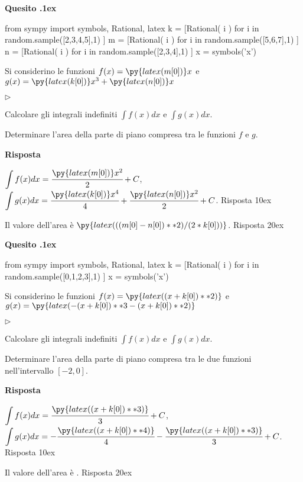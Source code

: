 \documentclass[11pt,twoside,a4paper]{article}
\newcommand{\mylabel}[1]{#1\hfill}
\renewenvironment{itemize}
  {\begin{list}{$\triangleright$}{%
   \setlength{\parskip}{0mm}
   \setlength{\topsep}{.4\baselineskip}
   \setlength{\rightmargin}{0mm}
   \setlength{\listparindent}{0mm}
   \setlength{\itemindent}{0mm}
   \setlength{\labelwidth}{2ex}
   \setlength{\itemsep}{.4\baselineskip}
   \setlength{\parsep}{0mm}
   \setlength{\partopsep}{0mm}
   \setlength{\labelsep}{1ex}
   \setlength{\leftmargin}{\labelwidth+\labelsep}
   \let\makelabel\mylabel}}{%
   \end{list}\vspace*{-1.3mm}}
\newcounter{quesito}
\newenvironment{question}{\bigskip\addtocounter{quesito}{1}\bigskip\bigskip\par\textbf{Quesito \thequesito.\kern1ex}}{\vspace{\parskip}}
\newenvironment{answer}{\par\textbf{Risposta\quad}}{\vspace{\parskip}}
\begin{document}
\begin{question}
\begin{pycode}
from sympy import symbols, Rational, latex
k = [Rational( i ) for i in random.sample([2,3,4,5],1) ]
m = [Rational( i ) for i in random.sample([5,6,7],1) ]
n = [Rational( i ) for i in random.sample([2,3,4],1) ]
x = symbols('x')
\end{pycode}
Si considerino le funzioni $f(x) = \py{latex(m[0])} x$ e $g(x) = \py{latex(k[0])} x^3 + \py{latex(n[0])} x$
\begin{itemize}
\item[1.] Calcolare gli integrali indefiniti $\displaystyle \int f(x) dx$ e $\displaystyle \int g(x) dx$.
\item[2.] Determinare l'area della parte di piano compresa tra le funzioni $f$ e $g$.
\end{itemize}
\begin{answer}

{\color{blue} $\displaystyle \int f(x) dx = \cfrac{\py{latex(m[0])} x^2}{2} + C$, $\displaystyle \int g(x) dx = \cfrac{\py{latex(k[0])}x^4}{4} +\cfrac{\py{latex(n[0])} x^2}{2} + C$. 
\hfill Risposta 1\kern0ex}


\medskip
{\color{blue} Il valore dell'area è $\py{latex(((m[0]-n[0])**2)/(2*k[0]))}$.
\hfill Risposta 2\kern0ex}

\end{answer}
\end{question}
\begin{question}
\begin{pycode}
from sympy import symbols, Rational, latex
k = [Rational( i ) for i in random.sample([0,1,2,3],1) ]
x = symbols('x')
\end{pycode}
Si considerino le funzioni $f(x) = \py{latex((x+k[0])**2)}$ e $g(x) =  \py{latex(-(x+k[0])**3-(x+k[0])**2)}$
\begin{itemize}
\item[1.] Calcolare gli integrali indefiniti $\displaystyle \int f(x) dx$ e $\displaystyle \int g(x) dx$.
\item[2.] Determinare l'area della parte di piano compresa tra le due funzioni nell'intervallo $[-2, 0]$.
\end{itemize}
\begin{answer}

{\color{blue} $\displaystyle \int f(x) dx = \cfrac{\py{latex((x+k[0])**3)}}{3} + C$, $\displaystyle \int g(x) dx = -\cfrac{\py{latex((x+k[0])**4)}}{4} -\cfrac{\py{latex((x+k[0])**3)}}{3} + C$. 
\hfill Risposta 1\kern0ex}

\medskip
{\color{blue} Il valore dell'area è .
\hfill Risposta 2\kern0ex}

\end{answer}
\end{question}
\end{document}
